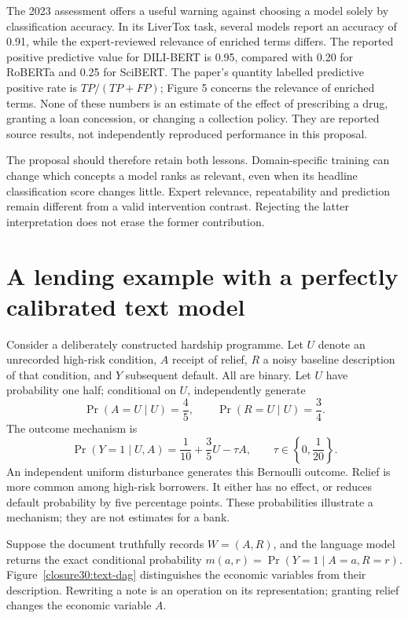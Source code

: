 The 2023 assessment offers a useful warning against choosing a model solely
by classification accuracy. In its LiverTox task, several models report an
accuracy of 0.91, while the expert-reviewed relevance of enriched terms
differs. The reported positive predictive value for DILI-BERT is 0.95,
compared with 0.20 for RoBERTa and 0.25 for SciBERT. The paper's quantity
labelled predictive positive rate is $TP/(TP+FP)$; Figure 5 concerns the
relevance of enriched terms. None of these numbers is an estimate of the
effect of prescribing a drug, granting a loan concession, or changing a
collection policy. They are reported source results, not independently
reproduced performance in this proposal.
\citep[pp.~1911--1916, Table 4 and Figure 5]{closure30pharma}

The proposal should therefore retain both lessons. Domain-specific training
can change which concepts a model ranks as relevant, even when its headline
classification score changes little. Expert relevance, repeatability and
prediction remain different from a valid intervention contrast. Rejecting
the latter interpretation does not erase the former contribution.

\section{A lending example with a perfectly calibrated text model}

Consider a deliberately constructed hardship programme. Let $U$ denote an
unrecorded high-risk condition, $A$ receipt of relief, $R$ a noisy baseline
description of that condition, and $Y$ subsequent default. All are binary.
Let $U$ have probability one half; conditional on $U$, independently generate
\begin{equation}
 \Pr(A=U\mid U)=\frac45,\qquad
 \Pr(R=U\mid U)=\frac34.
 \label{closure30:text-design}
\end{equation}
The outcome mechanism is
\begin{equation}
 \Pr(Y=1\mid U,A)=\frac1{10}+\frac35U-\tau A,
 \qquad \tau\in\left\{0,\frac1{20}\right\}.
 \label{closure30:text-outcome}
\end{equation}
An independent uniform disturbance generates this Bernoulli outcome.
Relief is more common among high-risk borrowers. It either has no effect,
or reduces default probability by five percentage points. These probabilities
illustrate a mechanism; they are not estimates for a bank.

Suppose the document truthfully records $W=(A,R)$, and the language model
returns the exact conditional probability $m(a,r)=\Pr(Y=1\mid A=a,R=r)$.
Figure~\ref{closure30:text-dag} distinguishes the economic variables from
their description. Rewriting a note is an operation on its representation;
granting relief changes the economic variable $A$.

